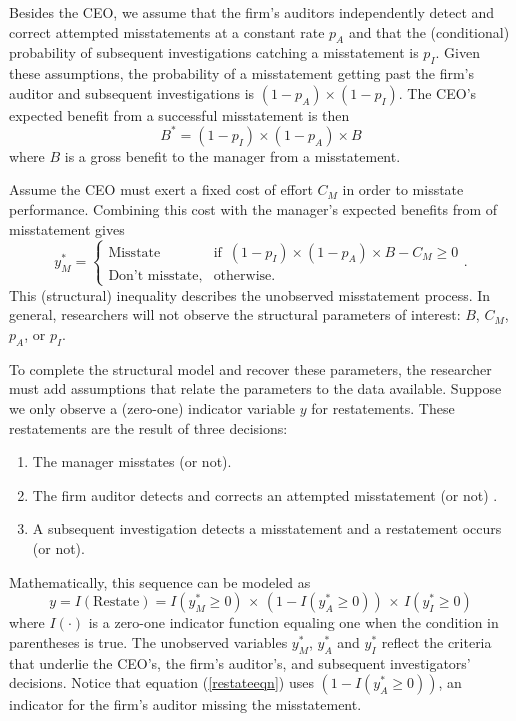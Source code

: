 Besides the CEO, we assume that the firm's auditors independently detect and correct attempted misstatements at a constant rate $p_A$ and that the (conditional) probability of subsequent investigations catching a misstatement is $p_I$.
Given these assumptions, the probability of a misstatement getting past the firm's  auditor and subsequent investigations is $(1-p_A) \times (1 - p_I)$.
The CEO's expected benefit from a successful misstatement is then
$$ B^* = (1-p_I) \times (1-p_A) \times B$$
where $B$ is a gross benefit to the manager from a misstatement. 

Assume the CEO must exert a fixed cost of effort $C_M$ in order to misstate performance. 
Combining this cost with the manager's expected benefits from of misstatement gives
\begin{equation}\label{bencost}
		y_M^* = 
		  \begin{cases}
				\mbox{Misstate} & \mbox{if }\, (1-p_I) \times (1-p_A) \times B - C_M \ge 0\\
				\mbox{Don't misstate,} & \mbox{otherwise}.
		  \end{cases}.
\end{equation}
This (structural) inequality describes the unobserved misstatement process. 
In general, researchers will not observe the structural parameters of
interest: $B$, $C_M$, $p_A$, or $p_I$.

To complete the structural model and recover these parameters, 
the researcher must add assumptions that relate the parameters to the data available.
Suppose we only observe a (zero-one) indicator variable $y$ for restatements.
These restatements are the result of three decisions:
\begin{enumerate}
\item The manager misstates (or not).
\item The firm auditor detects and corrects an attempted misstatement (or not) .
\item A subsequent investigation detects a misstatement and a restatement occurs (or not).
\end{enumerate}

Mathematically, this sequence can be modeled as
\begin{equation}\label{restateeqn}
 y = I(\mbox{Restate}) = I(y^*_M \ge 0) \, \times\, (1 - I(y^*_A \ge 0)) \, \times\, I(y^*_I \ge 0)
\end{equation}
where $I(\cdot)$ is a zero-one indicator function equaling one when the condition in parentheses is true.
The unobserved variables $y^*_M$, $y^*_A$ and $y^*_I$ reflect the criteria that underlie the CEO's, 
the firm's auditor's, and subsequent investigators' decisions.
Notice that equation (\ref{restateeqn}) uses $(1 - I(y^*_A \ge 0))$, an indicator for the firm's auditor missing the misstatement.

